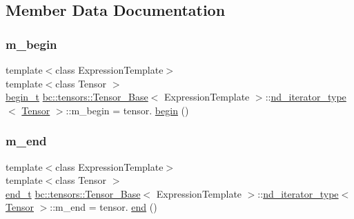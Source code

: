 \subsection{Member Data Documentation}
\mbox{\label{structbc_1_1tensors_1_1Tensor__Base_1_1nd__iterator__type_a312d75e12f47abbe404193c95e15189d}} 
\subsubsection{\texorpdfstring{m\+\_\+begin}{m\_begin}}
{\footnotesize\ttfamily template$<$class Expression\+Template$>$ \\
template$<$class Tensor $>$ \\
\hyperlink{structbc_1_1tensors_1_1Tensor__Base_1_1nd__iterator__type_a9b63eaeda87e319d02d937a5ebcb6cdf}{begin\+\_\+t} \hyperlink{classbc_1_1tensors_1_1Tensor__Base}{bc\+::tensors\+::\+Tensor\+\_\+\+Base}$<$ Expression\+Template $>$\+::\hyperlink{structbc_1_1tensors_1_1Tensor__Base_1_1nd__iterator__type}{nd\+\_\+iterator\+\_\+type}$<$ \hyperlink{namespacebc_a659391e47ab612be3ba6c18cf9c89159}{Tensor} $>$\+::m\+\_\+begin = tensor. \hyperlink{structbc_1_1tensors_1_1Tensor__Base_1_1nd__iterator__type_a430ba9b782f52539459544676f369e36}{begin} ()}

\mbox{\label{structbc_1_1tensors_1_1Tensor__Base_1_1nd__iterator__type_ac90dbfab4c9da5f3139954951af80756}} 
\subsubsection{\texorpdfstring{m\+\_\+end}{m\_end}}
{\footnotesize\ttfamily template$<$class Expression\+Template$>$ \\
template$<$class Tensor $>$ \\
\hyperlink{structbc_1_1tensors_1_1Tensor__Base_1_1nd__iterator__type_a3c6a8833df7b94e13446d929cd57e257}{end\+\_\+t} \hyperlink{classbc_1_1tensors_1_1Tensor__Base}{bc\+::tensors\+::\+Tensor\+\_\+\+Base}$<$ Expression\+Template $>$\+::\hyperlink{structbc_1_1tensors_1_1Tensor__Base_1_1nd__iterator__type}{nd\+\_\+iterator\+\_\+type}$<$ \hyperlink{namespacebc_a659391e47ab612be3ba6c18cf9c89159}{Tensor} $>$\+::m\+\_\+end = tensor. \hyperlink{structbc_1_1tensors_1_1Tensor__Base_1_1nd__iterator__type_aa4eda31e9f2052dc1c555a5cd1e9b2bc}{end} ()}

